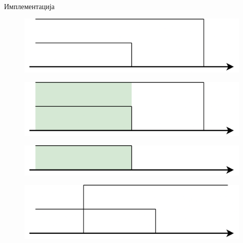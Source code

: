 \documentclass[xcolor=table]{beamer}
\begin{document}
\begin{frame}[allowframebreaks]{Имплементација}
        \framebreak
        
        \begin{figure}
            \centering
            \includegraphics[width=\textwidth,height=0.8\textheight,keepaspectratio]{images/uni_int16.png}
        \end{figure}
        
        \framebreak
        
        \begin{figure}
            \centering
            \includegraphics[width=\textwidth,height=0.8\textheight,keepaspectratio]{images/uni_int17.png}
        \end{figure}
        
        \framebreak
        
        \begin{figure}
            \centering
            \includegraphics[width=\textwidth,height=0.8\textheight,keepaspectratio]{images/uni_int15.png}
        \end{figure}
        
        \framebreak
        
        \begin{figure}
            \centering
            \includegraphics[width=\textwidth,height=0.8\textheight,keepaspectratio]{images/uni_int21.png}
        \end{figure}
        

\end{frame}
\end{document}

